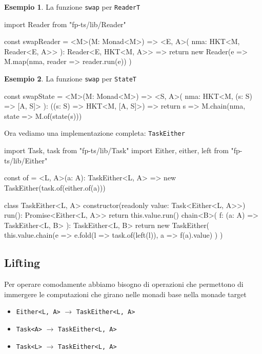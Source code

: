 \documentclass[12pt]{article}
\theoremstyle{definition}
\newtheorem{example}{Esempio}[section]
\newenvironment{code}
  {\vspace{0.5cm} \VerbatimEnvironment\begin{typescriptcode}}
  {\end{typescriptcode} \vspace{0.2cm}}
\begin{document}
\begin{example}
La funzione \texttt{swap} per \texttt{ReaderT}

\begin{code}
import { Reader } from "fp-ts/lib/Reader"

const swapReader = <M>(M: Monad<M>) => <E, A>(
  nma: HKT<M, Reader<E, A>>
): Reader<E, HKT<M, A>> => {
  return new Reader(e =>
    M.map(nma, reader => reader.run(e))
  )
}
\end{code}
\end{example}

\begin{example}
La funzione \texttt{swap} per \texttt{StateT}

\begin{code}
const swapState = <M>(M: Monad<M>) => <S, A>(
  nma: HKT<M, (s: S) => [A, S]>
): ((s: S) => HKT<M, [A, S]>) => {
  return s => M.chain(nma, state => M.of(state(s)))
}
\end{code}
\end{example}

Ora vediamo una implementazione completa: \texttt{TaskEither}

\begin{code}
import { Task, task } from "fp-ts/lib/Task"
import { Either, either, left } from "fp-ts/lib/Either"

const of = <L, A>(a: A): TaskEither<L, A> =>
  new TaskEither(task.of(either.of(a)))

class TaskEither<L, A> {
  constructor(readonly value: Task<Either<L, A>>) {}
  run(): Promise<Either<L, A>> {
    return this.value.run()
  }
  chain<B>(
    f: (a: A) => TaskEither<L, B>
  ): TaskEither<L, B> {
    return new TaskEither(
      this.value.chain(e =>
        e.fold(l => task.of(left(l)), a => f(a).value)
      )
    )
  }
}
\end{code}

\subsection{Lifting}

Per operare comodamente abbiamo bisogno di operazioni che permettono di immergere le computazioni che girano
nelle monadi base nella monade target

\begin{itemize}
\item \texttt{Either<L, A>} $\rightarrow$ \texttt{TaskEither<L, A>}
\item \texttt{Task<A>} $\rightarrow$ \texttt{TaskEither<L, A>}
\item \texttt{Task<L>} $\rightarrow$ \texttt{TaskEither<L, A>}
\end{itemize}
\end{document}
